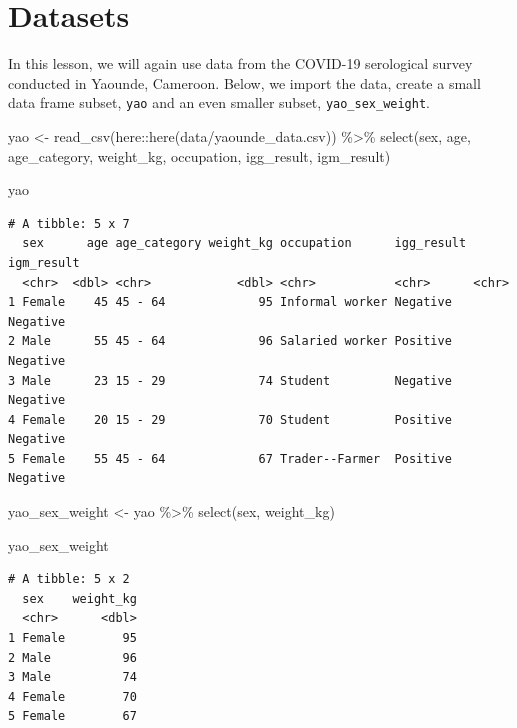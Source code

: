 \documentclass[
  letterpaper,
  DIV=11,
  numbers=noendperiod]{scrreprt}
\newenvironment{Shaded}{\begin{snugshade}}{\end{snugshade}}
\newcommand{\FunctionTok}[1]{\textcolor[rgb]{0.28,0.35,0.67}{#1}}
\newcommand{\NormalTok}[1]{\textcolor[rgb]{0.00,0.23,0.31}{#1}}
\newcommand{\OtherTok}[1]{\textcolor[rgb]{0.00,0.23,0.31}{#1}}
\newcommand{\SpecialCharTok}[1]{\textcolor[rgb]{0.37,0.37,0.37}{#1}}
\newcommand{\StringTok}[1]{\textcolor[rgb]{0.13,0.47,0.30}{#1}}
\begin{document}
\section{Datasets}\label{datasets-2}

In this lesson, we will again use data from the COVID-19 serological
survey conducted in Yaounde, Cameroon. Below, we import the data, create
a small data frame subset, \texttt{yao} and an even smaller subset,
\texttt{yao\_sex\_weight}.

\begin{Shaded}
\begin{Highlighting}[]
\NormalTok{yao }\OtherTok{\textless{}{-}} 
  \FunctionTok{read\_csv}\NormalTok{(here}\SpecialCharTok{::}\FunctionTok{here}\NormalTok{(}\StringTok{\textquotesingle{}data/yaounde\_data.csv\textquotesingle{}}\NormalTok{))  }\SpecialCharTok{\%\textgreater{}\%} 
  \FunctionTok{select}\NormalTok{(sex, age, age\_category, weight\_kg, occupation, igg\_result, igm\_result)}

\NormalTok{yao}
\end{Highlighting}
\end{Shaded}

\begin{verbatim}
# A tibble: 5 x 7
  sex      age age_category weight_kg occupation      igg_result igm_result
  <chr>  <dbl> <chr>            <dbl> <chr>           <chr>      <chr>     
1 Female    45 45 - 64             95 Informal worker Negative   Negative  
2 Male      55 45 - 64             96 Salaried worker Positive   Negative  
3 Male      23 15 - 29             74 Student         Negative   Negative  
4 Female    20 15 - 29             70 Student         Positive   Negative  
5 Female    55 45 - 64             67 Trader--Farmer  Positive   Negative  
\end{verbatim}

\begin{Shaded}
\begin{Highlighting}[]
\NormalTok{yao\_sex\_weight }\OtherTok{\textless{}{-}} 
\NormalTok{  yao }\SpecialCharTok{\%\textgreater{}\%} 
  \FunctionTok{select}\NormalTok{(sex, weight\_kg)}

\NormalTok{yao\_sex\_weight}
\end{Highlighting}
\end{Shaded}

\begin{verbatim}
# A tibble: 5 x 2
  sex    weight_kg
  <chr>      <dbl>
1 Female        95
2 Male          96
3 Male          74
4 Female        70
5 Female        67
\end{verbatim}
\end{document}
